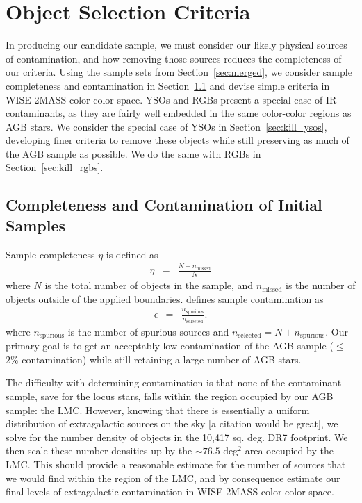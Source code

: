\section{Object Selection Criteria}
\label{sec:criteria}
In producing our candidate sample, we must consider our likely physical sources of contamination, and how removing those sources reduces the completeness of our criteria. Using the sample sets from Section~\ref{sec:merged}, we consider sample completeness and contamination in Section~\ref{sec:comp_cont} and devise simple criteria in WISE-2MASS color-color space. YSOs and RGBs present a special case of IR contaminants, as they are fairly well embedded in the same color-color regions as AGB stars. We consider the special case of YSOs in Section~\ref{sec:kill_ysos}, developing finer criteria to remove these objects while still preserving as much of the AGB sample as possible. We do the same with RGBs in Section~\ref{sec:kill_rgbs}.

\subsection{Completeness and Contamination of Initial Samples}\label{sec:comp_cont}
Sample completeness $\eta$ is defined as
\begin{eqnarray*}
\eta &=& \frac{N - n_\text{missed}}{N}
\end{eqnarray*}
where $N$ is the total number of objects in the sample, and $n_\text{missed}$ is the number of objects outside of the applied boundaries. \cite{2013sdmm.book.....I} defines sample contamination as
\begin{eqnarray*}
\epsilon &=& \frac{n_\text{spurious}}{n_\text{selected}}.
\end{eqnarray*}
where $n_\text{spurious}$ is the number of spurious sources and $n_\text{selected} = N + n_\text{spurious}$. Our primary goal is to get an acceptably low contamination of the AGB sample ($\le$2\% contamination) while still retaining a large number of AGB stars.

The difficulty with determining contamination is that none of the contaminant sample, save for the locus stars,  falls within the region occupied by our AGB sample: the LMC. However, knowing that there is essentially a uniform distribution of extragalactic sources on the sky {\color{red}[a citation would be great]}, we solve for the number density of objects in the 10,417 sq. deg. DR7 footprint. We then scale these number densities up by the $\sim76.5$ deg$^2$ area occupied by the LMC. This should provide a reasonable estimate for the number of sources that we would find within the region of the LMC, and by consequence estimate our final levels of extragalactic contamination in WISE-2MASS color-color space. 

